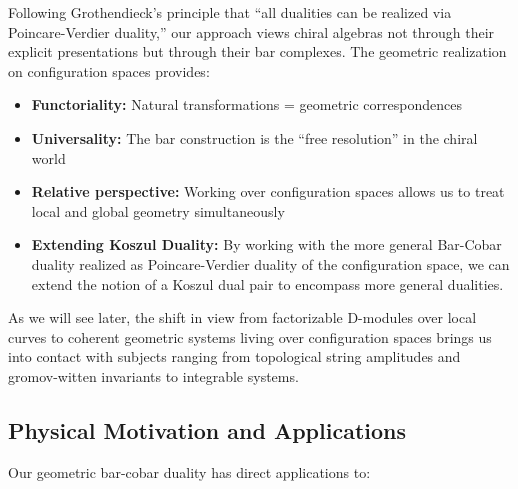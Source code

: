 \begin{remark}
Following Grothendieck's principle that ``all dualities can be realized via Poincare-Verdier duality,'' our approach views chiral algebras not through their explicit presentations but through their bar complexes. The geometric realization on configuration spaces provides:
\begin{itemize}
\item \textbf{Functoriality:} Natural transformations = geometric correspondences
\item \textbf{Universality:} The bar construction is the ``free resolution'' in the chiral world
\item \textbf{Relative perspective:} Working over configuration spaces allows us to treat local and global geometry simultaneously
\item \textbf{Extending Koszul Duality:} By working with the more general Bar-Cobar duality realized as Poincare-Verdier duality of the configuration space, we can extend the notion of a Koszul dual pair to encompass more general dualities.
\end{itemize}
As we will see later, the shift in view from factorizable D-modules over local curves to coherent geometric systems living over configuration spaces brings us into contact with subjects ranging from topological string amplitudes and gromov-witten invariants to integrable systems.
\end{remark}

\subsection{Physical Motivation and Applications}

Our geometric bar-cobar duality has direct applications to:

